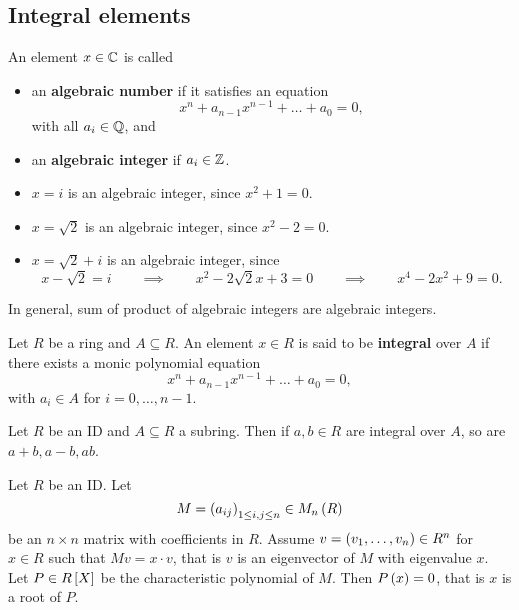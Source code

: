 \subsection{Integral elements}

\begin{definition}
An element $ x \in \C $ is called
\begin{itemize}
\item an \textbf{algebraic number} if it satisfies an equation
$$ x^n + a_{n - 1}x^{n - 1} + \dots + a_0 = 0, $$
with all $ a_i \in \Q $, and
\item an \textbf{algebraic integer} if $ a_i \in \Z $.
\end{itemize}
\end{definition}

\begin{example*}
\hfill
\begin{itemize}
\item $ x = i $ is an algebraic integer, since $ x^2 + 1 = 0 $.
\item $ x = \sqrt{2} $ is an algebraic integer, since $ x^2 - 2 = 0 $.
\item $ x = \sqrt{2} + i $ is an algebraic integer, since
$$ x - \sqrt{2} = i \qquad \implies \qquad x^2 - 2\sqrt{2}x + 3 = 0 \qquad \implies \qquad x^4 - 2x^2 + 9 = 0. $$
\end{itemize}
\end{example*}

In general, sum of product of algebraic integers are algebraic integers.

\begin{definition}
Let $ R $ be a ring and $ A \subseteq R $. An element $ x \in R $ is said to be \textbf{integral} over $ A $ if there exists a monic polynomial equation
$$ x^n + a_{n - 1}x^{n - 1} + \dots + a_0 = 0, $$
with $ a_i \in A $ for $ i = 0, \dots, n - 1 $.
\end{definition}

\begin{theorem}
\label{thm:integralsubring}
Let $ R $ be an ID and $ A \subseteq R $ a subring. Then if $ a, b \in R $ are integral over $ A $, so are $ a + b, a - b, ab $.
\end{theorem}

\begin{lemma}
\label{lem:cayleyhamilton}
Let $ R $ be an ID. Let
$$ M = \rb{a_{ij}}_{1 \le i, j \le n} \in M_n\rb{R} $$
be an $ n \times n $ matrix with coefficients in $ R $. Assume $ v = \rb{v_1, \dots, v_n} \in R^n $ for $ x \in R $ such that $ Mv = x \cdot v $, that is $ v $ is an eigenvector of $ M $ with eigenvalue $ x $. Let $ P \in R\sb{X} $ be the characteristic polynomial of $ M $. Then $ P\rb{x} = 0 $, that is $ x $ is a root of $ P $.
\end{lemma}

